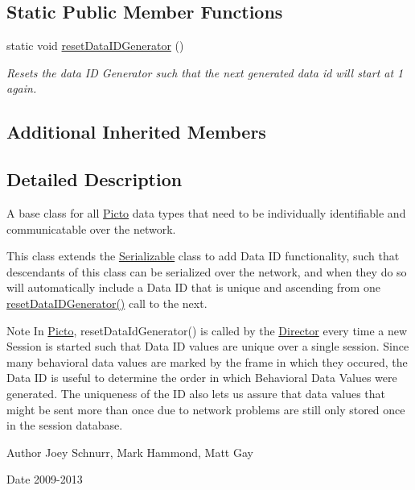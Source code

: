 \subsection*{Static Public Member Functions}
\begin{DoxyCompactItemize}
\item 
\hypertarget{class_picto_1_1_data_unit_ae7b3fbd32259595a1c4e0a28c5564aba}{static void \hyperlink{class_picto_1_1_data_unit_ae7b3fbd32259595a1c4e0a28c5564aba}{reset\-Data\-I\-D\-Generator} ()}\label{class_picto_1_1_data_unit_ae7b3fbd32259595a1c4e0a28c5564aba}

\begin{DoxyCompactList}\small\item\em Resets the data I\-D Generator such that the next generated data id will start at 1 again. \end{DoxyCompactList}\end{DoxyCompactItemize}
\subsection*{Additional Inherited Members}


\subsection{Detailed Description}
A base class for all \hyperlink{namespace_picto}{Picto} data types that need to be individually identifiable and communicatable over the network. 

This class extends the \hyperlink{class_picto_1_1_serializable}{Serializable} class to add Data I\-D functionality, such that descendants of this class can be serialized over the network, and when they do so will automatically include a Data I\-D that is unique and ascending from one \hyperlink{class_picto_1_1_data_unit_ae7b3fbd32259595a1c4e0a28c5564aba}{reset\-Data\-I\-D\-Generator()} call to the next. \begin{DoxyNote}{Note}
In \hyperlink{namespace_picto}{Picto}, reset\-Data\-Id\-Generator() is called by the \hyperlink{class_director}{Director} every time a new Session is started such that Data I\-D values are unique over a single session. Since many behavioral data values are marked by the frame in which they occured, the Data I\-D is useful to determine the order in which Behavioral Data Values were generated. The uniqueness of the I\-D also lets us assure that data values that might be sent more than once due to network problems are still only stored once in the session database. 
\end{DoxyNote}
\begin{DoxyAuthor}{Author}
Joey Schnurr, Mark Hammond, Matt Gay 
\end{DoxyAuthor}
\begin{DoxyDate}{Date}
2009-\/2013 
\end{DoxyDate}


